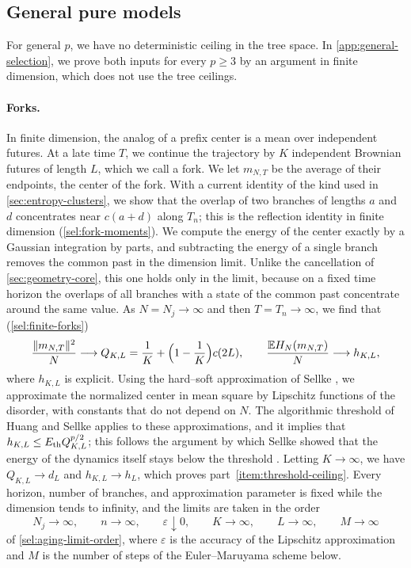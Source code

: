 \subsection{General pure models}
For general $p$, we have no deterministic ceiling in the tree space. In \cref{app:general-selection}, we prove both inputs for every $p\ge3$ by an argument in finite dimension, which does not use the tree ceilings.

\paragraph{Forks.}
In finite dimension, the analog of a prefix center is a mean over independent futures. At a late time $T$, we continue the trajectory by $K$ independent Brownian futures of length $L$, which we call a fork. We let $m_{N,T}$ be the average of their endpoints, the center of the fork. With a current identity of the kind used in \cref{sec:entropy-clusters}, we show that the overlap of two branches of lengths $a$ and $d$ concentrates near $c(a+d)$ along $T_n$; this is the reflection identity in finite dimension (\cref{sel:fork-moments}). We compute the energy of the center exactly by a Gaussian integration by parts, and subtracting the energy of a single branch removes the common past in the dimension limit. Unlike the cancellation of \cref{sec:geometry-core}, this one holds only in the limit, because on a fixed time horizon the overlaps of all branches with a state of the common past concentrate around the same value. As $N=N_j\to\infty$ and then $T=T_n\to\infty$, we find that (\cref{sel:finite-forks})
\[
 \frac{\lVert m_{N,T}\rVert^2}N\longrightarrow Q_{K,L}=\frac1K+\Bigl(1-\frac1K\Bigr)c(2L),\qquad
 \frac{\mathbb E H_N(m_{N,T})}N\longrightarrow h_{K,L},
\]
where $h_{K,L}$ is explicit. Using the hard--soft approximation of Sellke \cite[Lemmas~3.1 and~3.2]{sellke2024}, we approximate the normalized center in mean square by Lipschitz functions of the disorder, with constants that do not depend on $N$. The algorithmic threshold of Huang and Sellke \cite[Theorem~1 and Corollary~1.8]{hs2023} applies to these approximations, and it implies that $h_{K,L}\le E_{\mathrm{th}} Q_{K,L}^{p/2}$; this follows the argument by which Sellke showed that the energy of the dynamics itself stays below the threshold \cite[Section~3]{sellke2024}. Letting $K\to\infty$, we have $Q_{K,L}\to d_L$ and $h_{K,L}\to h_L$, which proves part~\ref{item:threshold-ceiling}. Every horizon, number of branches, and approximation parameter is fixed while the dimension tends to infinity, and the limits are taken in the order
\[
 N_j\to\infty,\qquad n\to\infty,\qquad \varepsilon\downarrow0,\qquad K\to\infty,\qquad L\to\infty,\qquad M\to\infty
\]
of \eqref{sel:aging-limit-order}, where $\varepsilon$ is the accuracy of the Lipschitz approximation and $M$ is the number of steps of the Euler--Maruyama scheme below.

